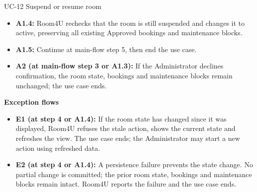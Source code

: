 \begin{usecasebox}{UC-12 Suspend or resume room}
\begin{itemize}[label={},leftmargin=0pt,itemsep=1pt,topsep=1pt]
  \item \textbf{A1.4:} Room4U rechecks that the room is still suspended and changes it to active, preserving all existing Approved bookings and maintenance blocks.
  \item \textbf{A1.5:} Continue at main-flow step 5, then end the use case.
  \item \textbf{A2 (at main-flow step 3 or A1.3):} If the Administrator declines confirmation, the room state, bookings and maintenance blocks remain unchanged; the use case ends.
\end{itemize}
\textbf{Exception flows}
\begin{itemize}[label={},leftmargin=0pt,itemsep=1pt,topsep=1pt]
  \item \textbf{E1 (at step 4 or A1.4):} If the room state has changed since it was displayed, Room4U refuses the stale action, shows the current state and refreshes the view. The use case ends; the Administrator may start a new action using refreshed data.
  \item \textbf{E2 (at step 4 or A1.4):} A persistence failure prevents the state change. No partial change is committed; the prior room state, bookings and maintenance blocks remain intact. Room4U reports the failure and the use case ends.
\end{itemize}
\end{usecasebox}

